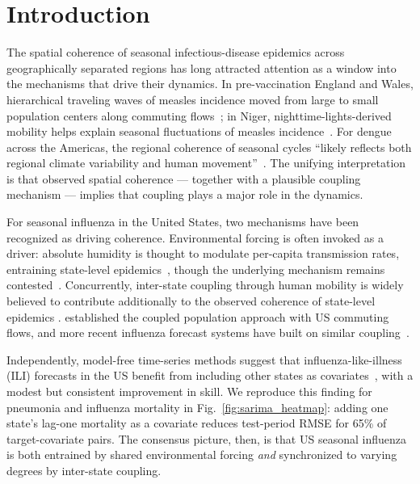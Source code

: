 \documentclass[11pt]{article}
\begin{document}
\section{Introduction}
The spatial coherence of seasonal infectious-disease epidemics across
geographically separated regions has long attracted attention as a
window into the mechanisms that drive their dynamics. In
pre-vaccination England and Wales, hierarchical traveling waves of
measles incidence moved from large to small population centers along
commuting flows~\citep{grenfell2001}; in Niger,
nighttime-lights-derived mobility helps explain seasonal fluctuations
of measles incidence~\citep{bharti2018}. For dengue across the
Americas, the regional coherence of seasonal cycles ``likely reflects
both regional climate variability and human
movement''~\citep{quandelacy2025}.
The unifying interpretation is that observed spatial coherence ---
together with a plausible coupling mechanism --- implies that coupling
plays a major role in the dynamics.

For seasonal influenza in the United States, two mechanisms have been
recognized as driving coherence. Environmental forcing is often
invoked as a driver: absolute humidity is thought to modulate
per-capita transmission rates, entraining state-level
epidemics~\citep{shaman2009, shaman2010}, though the underlying
mechanism remains contested~\citep{marr2019}. Concurrently, inter-state
coupling through human mobility is widely believed to contribute
additionally to the observed coherence of state-level epidemics
\citep{viboud2006, charu2017, dejong2024, zhang2026}. \citet{yang2014}
established the coupled population approach with US commuting flows,
and more recent influenza forecast systems have built on similar
coupling~\citep{pei2018, osthus2021}.

Independently, model-free time-series methods suggest that influenza-like-illness (ILI)
forecasts in the US benefit from including other states as
covariates~\citep{thivierge2025}, with a modest but consistent
improvement in skill. We reproduce this finding for pneumonia and
influenza mortality in Fig.~\ref{fig:sarima_heatmap}: adding one
state's lag-one mortality as a covariate reduces test-period RMSE for
65\% of target-covariate pairs. The consensus picture, then, is that
US seasonal influenza is both entrained by shared environmental
forcing \emph{and} synchronized to varying degrees by inter-state
coupling.
\end{document}
